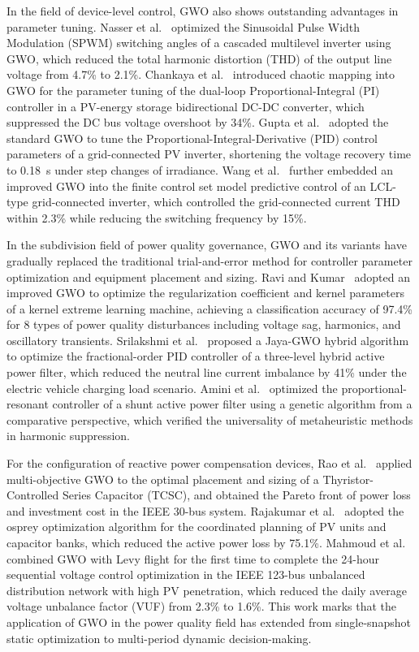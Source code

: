 In the field of device-level control, GWO also shows outstanding advantages in parameter tuning. Nasser et al.~\cite{b6} optimized the Sinusoidal Pulse Width Modulation (SPWM) switching angles of a cascaded multilevel inverter using GWO, which reduced the total harmonic distortion (THD) of the output line voltage from 4.7\% to 2.1\%. Chankaya et al.~\cite{b7} introduced chaotic mapping into GWO for the parameter tuning of the dual-loop Proportional-Integral (PI) controller in a PV-energy storage bidirectional DC-DC converter, which suppressed the DC bus voltage overshoot by 34\%. Gupta et al.~\cite{b8} adopted the standard GWO to tune the Proportional-Integral-Derivative (PID) control parameters of a grid-connected PV inverter, shortening the voltage recovery time to 0.18~s under step changes of irradiance. Wang et al.~\cite{b9} further embedded an improved GWO into the finite control set model predictive control of an LCL-type grid-connected inverter, which controlled the grid-connected current THD within 2.3\% while reducing the switching frequency by 15\%.

In the subdivision field of power quality governance, GWO and its variants have gradually replaced the traditional trial-and-error method for controller parameter optimization and equipment placement and sizing. Ravi and Kumar~\cite{b10} adopted an improved GWO to optimize the regularization coefficient and kernel parameters of a kernel extreme learning machine, achieving a classification accuracy of 97.4\% for 8 types of power quality disturbances including voltage sag, harmonics, and oscillatory transients. Srilakshmi et al.~\cite{b11} proposed a Jaya-GWO hybrid algorithm to optimize the fractional-order PID controller of a three-level hybrid active power filter, which reduced the neutral line current imbalance by 41\% under the electric vehicle charging load scenario. Amini et al.~\cite{b12} optimized the proportional-resonant controller of a shunt active power filter using a genetic algorithm from a comparative perspective, which verified the universality of metaheuristic methods in harmonic suppression.

For the configuration of reactive power compensation devices, Rao et al.~\cite{b13} applied multi-objective GWO to the optimal placement and sizing of a Thyristor-Controlled Series Capacitor (TCSC), and obtained the Pareto front of power loss and investment cost in the IEEE 30-bus system. Rajakumar et al.~\cite{b14} adopted the osprey optimization algorithm for the coordinated planning of PV units and capacitor banks, which reduced the active power loss by 75.1\%. Mahmoud et al.~\cite{b15} combined GWO with Levy flight for the first time to complete the 24-hour sequential voltage control optimization in the IEEE 123-bus unbalanced distribution network with high PV penetration, which reduced the daily average voltage unbalance factor (VUF) from 2.3\% to 1.6\%. This work marks that the application of GWO in the power quality field has extended from single-snapshot static optimization to multi-period dynamic decision-making.

